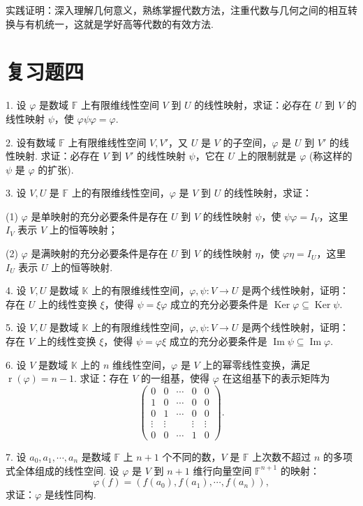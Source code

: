 \documentclass[UTF8,12pt,a4paper,fontset=fandol]{ctexart}
\begin{document}
实践证明：深入理解几何意义，熟练掌握代数方法，注重代数与几何之间的相互转换与有机统一，这就是学好高等代数的有效方法.

\section*{复习题四}

1. 设 $\varphi$ 是数域 $\mathbb{F}$ 上有限维线性空间 $V$ 到 $U$ 的线性映射，求证：必存在 $U$ 到 $V$ 的线性映射 $\psi$，使 $\varphi\psi\varphi=\varphi$.

2. 设有数域 $\mathbb{F}$ 上有限维线性空间 $V,V'$，又 $U$ 是 $V$ 的子空间，$\varphi$ 是 $U$ 到 $V'$ 的线性映射. 求证：必存在 $V$ 到 $V'$ 的线性映射 $\psi$，它在 $U$ 上的限制就是 $\varphi$ (称这样的 $\psi$ 是 $\varphi$ 的扩张).

3. 设 $V,U$ 是 $\mathbb{F}$ 上的有限维线性空间，$\varphi$ 是 $V$ 到 $U$ 的线性映射，求证：

(1) $\varphi$ 是单映射的充分必要条件是存在 $U$ 到 $V$ 的线性映射 $\psi$，使 $\psi\varphi=I_V$，这里 $I_V$ 表示 $V$ 上的恒等映射；

(2) $\varphi$ 是满映射的充分必要条件是存在 $U$ 到 $V$ 的线性映射 $\eta$，使 $\varphi\eta=I_U$，这里 $I_U$ 表示 $U$ 上的恒等映射.

4. 设 $V,U$ 是数域 $\mathbb{K}$ 上的有限维线性空间，$\varphi,\psi:V\to U$ 是两个线性映射，证明：存在 $U$ 上的线性变换 $\xi$，使得 $\psi=\xi\varphi$ 成立的充分必要条件是 $\operatorname{Ker}\varphi\subseteq\operatorname{Ker}\psi$.

5. 设 $V,U$ 是数域 $\mathbb{K}$ 上的有限维线性空间，$\varphi,\psi:V\to U$ 是两个线性映射，证明：存在 $V$ 上的线性变换 $\xi$，使得 $\psi=\varphi\xi$ 成立的充分必要条件是 $\operatorname{Im}\psi\subseteq\operatorname{Im}\varphi$.

6. 设 $V$ 是数域 $\mathbb{K}$ 上的 $n$ 维线性空间，$\varphi$ 是 $V$ 上的幂零线性变换，满足 $\operatorname{r}(\varphi)=n-1$. 求证：存在 $V$ 的一组基，使得 $\varphi$ 在这组基下的表示矩阵为
\[
\left(\begin{array}{ccccc}
0&0&\cdots&0&0\\
1&0&\cdots&0&0\\
0&1&\cdots&0&0\\
\vdots&\vdots&&\vdots&\vdots\\
0&0&\cdots&1&0
\end{array}\right).
\]

7. 设 $a_0,a_1,\cdots,a_n$ 是数域 $\mathbb{F}$ 上 $n+1$ 个不同的数，$V$ 是 $\mathbb{F}$ 上次数不超过 $n$ 的多项式全体组成的线性空间. 设 $\varphi$ 是 $V$ 到 $n+1$ 维行向量空间 $\mathbb{F}^{n+1}$ 的映射：
\[
\varphi(f)=(f(a_0),f(a_1),\cdots,f(a_n)),
\]
求证：$\varphi$ 是线性同构.
\end{document}
